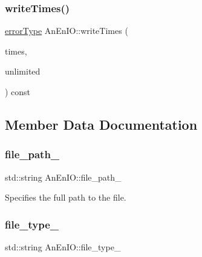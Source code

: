 \mbox{\label{class_an_en_i_o_a13ba268b1cae107c145ad8ed895ddedd}} 
\subsubsection{\texorpdfstring{write\+Times()}{writeTimes()}}
{\footnotesize\ttfamily \mbox{\hyperlink{class_an_en_i_o_aa56bc1ec6610b86db4349bce20f9ead0}{error\+Type}} An\+En\+I\+O\+::write\+Times (\begin{DoxyParamCaption}\item[{const \mbox{\hyperlink{classanen_time_1_1_times}{anen\+Time\+::\+Times}} \&}]{times,  }\item[{bool}]{unlimited }\end{DoxyParamCaption}) const}



\subsection{Member Data Documentation}
\mbox{\label{class_an_en_i_o_ab892e06ca18be5e0c442c9e882e4475f}} 
\subsubsection{\texorpdfstring{file\+\_\+path\+\_\+}{file\_path\_}}
{\footnotesize\ttfamily std\+::string An\+En\+I\+O\+::file\+\_\+path\+\_\+\hspace{0.3cm}{\ttfamily [protected]}}

Specifies the full path to the file. \mbox{\label{class_an_en_i_o_addbfb455f641a394c14907163874d8fe}} 
\subsubsection{\texorpdfstring{file\+\_\+type\+\_\+}{file\_type\_}}
{\footnotesize\ttfamily std\+::string An\+En\+I\+O\+::file\+\_\+type\+\_\+\hspace{0.3cm}{\ttfamily [protected]}}


